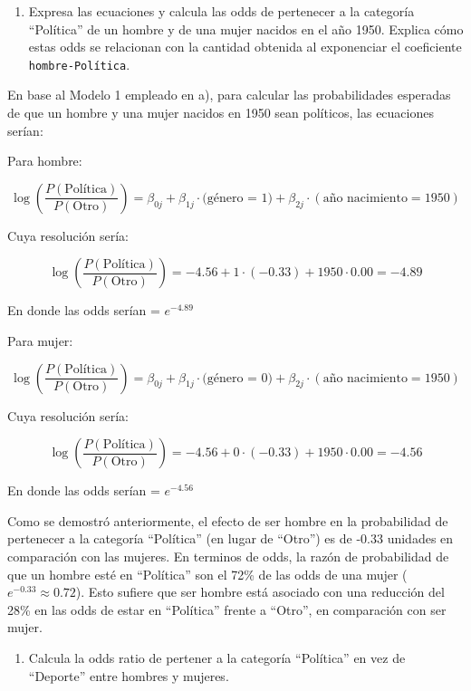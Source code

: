 \documentclass[
  12pt,
  a4paper,
]{article}
\providecommand{\tightlist}{%
  \setlength{\itemsep}{0pt}\setlength{\parskip}{0pt}}
\begin{document}
\begin{enumerate}
\def\labelenumi{\alph{enumi})}
\setcounter{enumi}{1}
\tightlist
\item
  Expresa las ecuaciones y calcula las odds de pertenecer a la categoría ``Política'' de un hombre y de una mujer nacidos en el año 1950. Explica cómo estas odds se relacionan con la cantidad obtenida al exponenciar el coeficiente \texttt{hombre-Política}.
\end{enumerate}

En base al Modelo 1 empleado en a), para calcular las probabilidades esperadas de que un hombre y una mujer nacidos en 1950 sean políticos, las ecuaciones serían:

Para hombre:

\[
\log\left(\frac{P(\text{Política})}{P(\text{Otro})}\right) = \beta_{0j} + \beta_{1j} \cdot \text{(género = 1}) + \beta_{2j} \cdot (\text{año nacimiento}=1950) 
\]

Cuya resolución sería:

\[
\log\left(\frac{P(\text{Política})}{P(\text{Otro})}\right) = -4.56 + 1 \cdot (-0.33) + 1950 \cdot 0.00 = -4.89
\]

En donde las odds serían = \(e^{-4.89}\)

Para mujer:

\[
\log\left(\frac{P(\text{Política})}{P(\text{Otro})}\right) = \beta_{0j} + \beta_{1j} \cdot \text{(género = 0}) + \beta_{2j} \cdot (\text{año nacimiento}=1950) 
\]

Cuya resolución sería:

\[
\log\left(\frac{P(\text{Política})}{P(\text{Otro})}\right) = -4.56 + 0 \cdot (-0.33) + 1950 \cdot 0.00 = -4.56
\]

En donde las odds serían = \(e^{-4.56}\)

Como se demostró anteriormente, el efecto de ser hombre en la probabilidad de pertenecer a la categoría ``Política'' (en lugar de ``Otro'') es de -0.33 unidades en comparación con las mujeres. En terminos de odds, la razón de probabilidad de que un hombre esté en ``Política'' son el 72\% de las odds de una mujer (\(e^{-0.33} \approx 0.72\)). Esto sufiere que ser hombre está asociado con una reducción del 28\% en las odds de estar en ``Política'' frente a ``Otro'', en comparación con ser mujer.

\begin{enumerate}
\def\labelenumi{\alph{enumi})}
\setcounter{enumi}{2}
\tightlist
\item
  Calcula la odds ratio de pertener a la categoría ``Política'' en vez de ``Deporte'' entre hombres y mujeres.
\end{enumerate}
\end{document}
